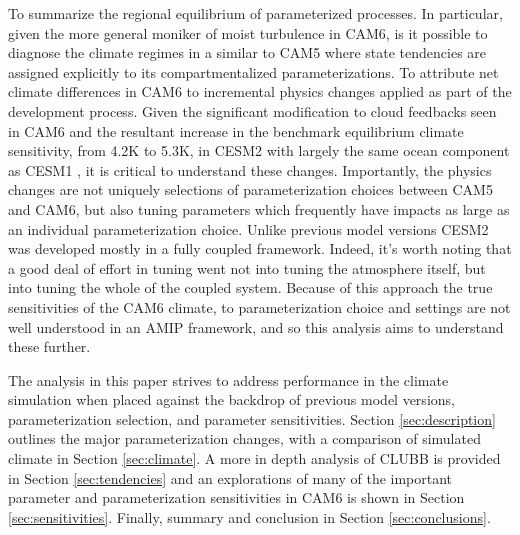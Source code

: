 To summarize the regional equilibrium of parameterized processes. In particular, given the more general moniker of moist turbulence in CAM6, is it possible to diagnose the climate regimes in a similar to CAM5 where state tendencies are assigned explicitly to its compartmentalized parameterizations. To attribute net climate differences in CAM6 to incremental physics changes applied as part of the development process. Given the significant modification to cloud feedbacks seen in CAM6 \citep{Gettelman2019} and the resultant increase in the benchmark equilibrium climate sensitivity, from 4.2K to 5.3K, in CESM2 with largely the same ocean component as CESM1 \citep{Bacmeister2020}, it is critical to understand these changes. Importantly, the physics changes are not uniquely selections of parameterization choices between CAM5 and CAM6, but also tuning parameters which frequently have impacts as large as an individual parameterization choice. Unlike previous model versions CESM2 was developed mostly in a fully coupled framework. Indeed, it's worth noting that a good deal of effort in tuning went not into tuning the atmosphere itself, but into tuning the whole of the coupled system. Because of this approach the true sensitivities of the CAM6 climate, to parameterization choice and settings are not well understood in an AMIP framework, and so this analysis aims to understand these further.


The analysis in this paper strives to address performance in the climate simulation when placed against the backdrop of previous model versions, parameterization selection, and parameter sensitivities. Section \ref{sec:description} outlines the major parameterization changes, with a comparison of simulated climate in Section \ref{sec:climate}. A more in depth analysis of CLUBB is provided in Section \ref{sec:tendencies} and an explorations of many of the important parameter and parameterization sensitivities in CAM6 is shown in Section \ref{sec:sensitivities}. Finally, summary and conclusion in Section \ref{sec:conclusions}.

